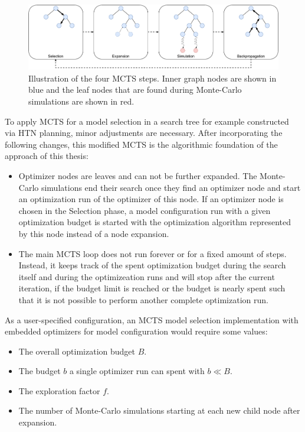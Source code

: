 \begin{figure}[ht!]
    \centering
    \includegraphics[width=\textwidth]{gfx/Figures/Approach/MCTS.pdf}
    \caption[Illustration of the four MCTS steps.]{Illustration of the four MCTS steps. Inner graph nodes are shown in blue and the leaf nodes that are found during Monte-Carlo simulations are shown in red.}
    \label{fig:approach:mcts}
\end{figure}

To apply MCTS for a model selection in a search tree for example constructed via HTN planning, minor adjustments are necessary.
After incorporating the following changes, this modified MCTS is the algorithmic foundation of the approach of this thesis:
\begin{itemize}
    \item Optimizer nodes are leaves and can not be further expanded. The Monte-Carlo simulations end their search once they find an optimizer node and start an optimization run of the optimizer of this node. If an optimizer node is chosen in the Selection phase, a model configuration run with a given optimization budget is started with the optimization algorithm represented by this node instead of a node expansion.
    \item The main MCTS loop does not run forever or for a fixed amount of steps. Instead, it keeps track of the spent optimization budget during the search itself and during the optimizeation runs and will stop after the current iteration, if the budget limit is reached or the budget is nearly spent such that it is not possible to perform another complete optimization run.
\end{itemize}
As a user-specified configuration, an MCTS model selection implementation with embedded optimizers for model configuration would require some values:
\begin{itemize}
    \item The overall optimization budget $B$.
    \item The budget $b$ a single optimizer run can spent with $b \ll B$.
    \item The exploration factor $f$.
    \item The number of Monte-Carlo simulations starting at each new child node after expansion.
\end{itemize}
